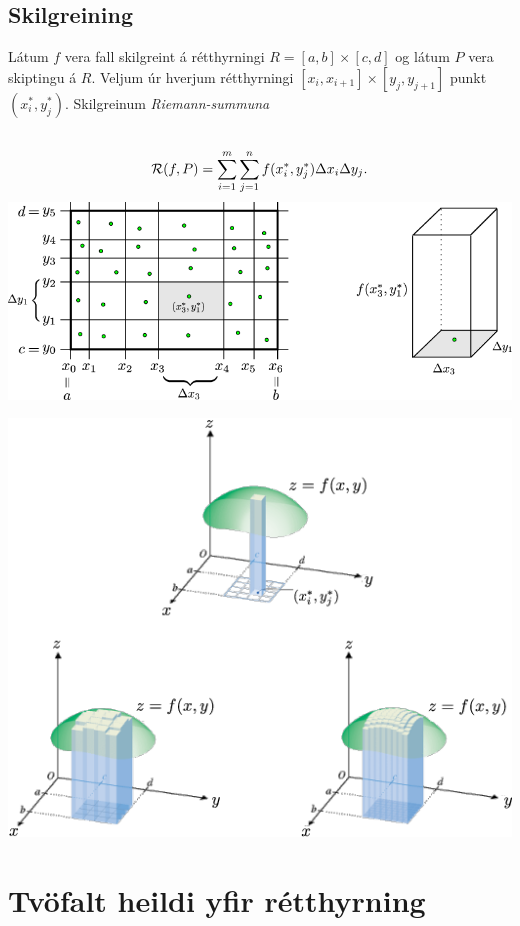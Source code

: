 \documentclass[a4paper,10pt,icelandic]{sphinxmanual}
\begin{document}
\subsection{Skilgreining}
\label{Kafli4:id1}
Látum \(f\) vera fall skilgreint á rétthyrningi
\(R=[a,b]\times[c,d]\) og látum \(P\) vera skiptingu á
\(R\). Veljum úr hverjum rétthyrningi
\([x_i,x_{i+1}]\times [y_j,y_{j+1}]\) punkt \((x_i^*, y_j^*)\).
Skilgreinum \emph{Riemann-summuna}
\begin{gather}
\begin{split}\displaystyle\end{split}\notag\\\begin{split}\mathcal{R}(f,P)=\sum_{i=1}^m\sum_{j=1}^n f(x_i^*, y_j^*)\Delta x_i\Delta
  y_j.\end{split}\notag
\end{gather}
{\hfill\includegraphics[width=0.800\linewidth]{skipting2.png}\hfill}

{\hfill\includegraphics[width=0.750\linewidth]{double.png}\hfill}


\section{Tvöfalt heildi yfir rétthyrning}
\label{Kafli4:tvofalt-heildi-yfir-retthyrning}\label{Kafli4:index-2}
\end{document}
